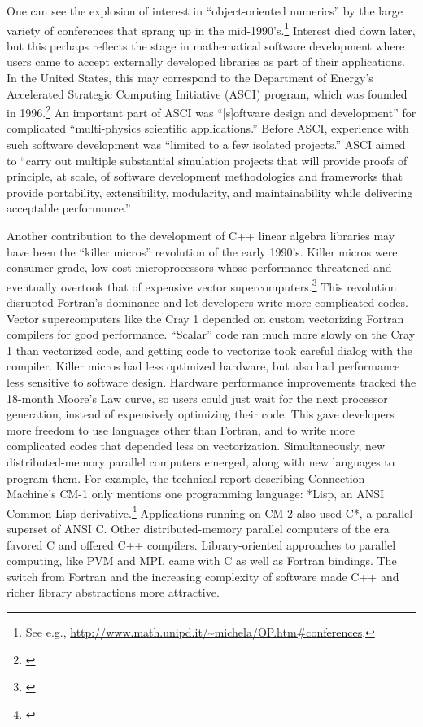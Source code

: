 One can see the explosion of interest in ``object-oriented numerics'' by the large
variety of conferences that sprang up in the mid-1990's.\footnote{See e.g.,
\url{http://www.math.unipd.it/~michela/OP.htm#conferences}.} Interest died
down later, but this perhaps reflects the stage in mathematical software development
where users came to accept externally developed libraries as part of their
applications. In the United States, this may correspond to the
Department of Energy's Accelerated Strategic Computing Initiative
(ASCI) program, which was founded in 1996.\footnote{\cite{messina1996asci}}
An important part of ASCI was ``[s]oftware design and development''
for complicated ``multi-physics scientific applications.''
Before ASCI, experience with such software development was ``limited to a few
isolated projects.'' ASCI aimed to ``carry out multiple substantial simulation
projects that will provide proofs of principle, at scale, of software development
methodologies and frameworks that provide portability, extensibility, modularity,
and maintainability while delivering acceptable performance.''

Another contribution to the development of C++ linear algebra
libraries may have been the ``killer micros'' revolution of the early
1990's.  Killer micros were consumer-grade, low-cost microprocessors
whose performance threatened and eventually overtook that of expensive
vector supercomputers.\footnote{\cite{killermicros1991}} This
revolution disrupted Fortran's dominance and let developers write more
complicated codes.  Vector supercomputers like the Cray 1 depended on
custom vectorizing Fortran compilers for good performance.  ``Scalar''
code ran much more slowly on the Cray 1 than vectorized code, and
getting code to vectorize took careful dialog with the compiler.
Killer micros had less optimized hardware, but also had performance
less sensitive to software design.  Hardware performance improvements
tracked the 18-month Moore's Law curve, so users could just wait for
the next processor generation, instead of expensively optimizing their
code.  This gave developers more freedom to use languages other than
Fortran, and to write more complicated codes that depended less on
vectorization.  Simultaneously, new distributed-memory parallel
computers emerged, along with new languages to program them.  For
example, the technical report describing Connection Machine's CM-1
only mentions one programming language: *Lisp, an ANSI Common Lisp
derivative.\footnote{\cite{kahle1989cm1}} Applications running on CM-2
also used C*, a parallel superset of ANSI C.  Other distributed-memory
parallel computers of the era favored C and offered C++ compilers.
Library-oriented approaches to parallel computing, like PVM and MPI,
came with C as well as Fortran bindings.  The switch from Fortran and
the increasing complexity of software made C++ and richer library
abstractions more attractive.

